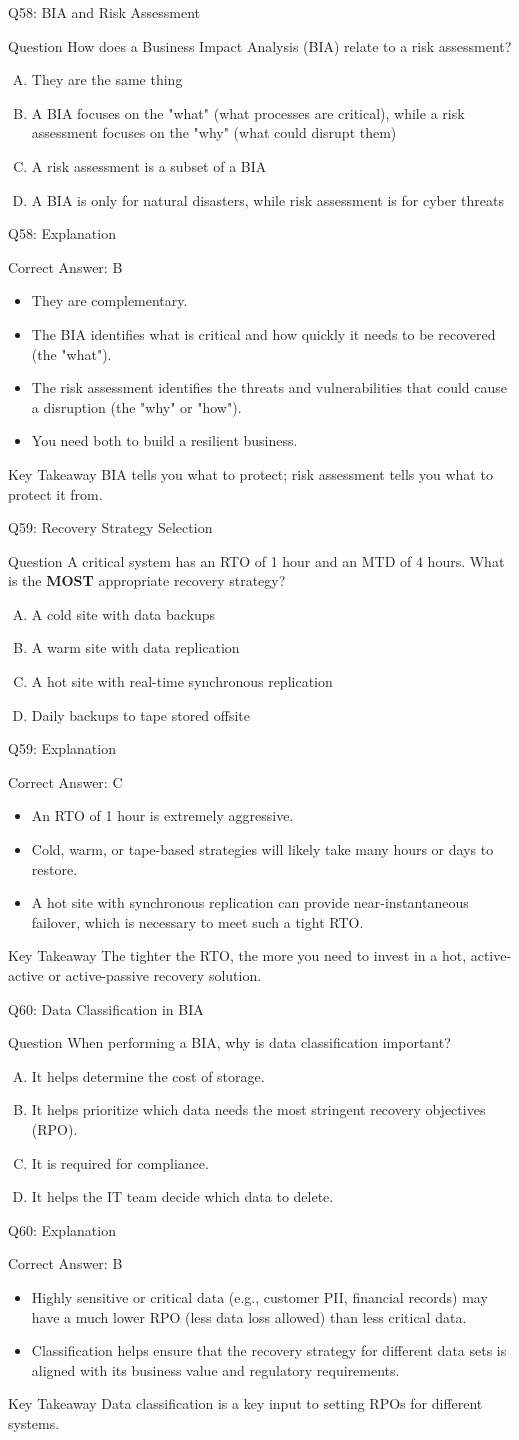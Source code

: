 \documentclass[aspectratio=169]{beamer}
\newcommand{\hq}[7]{%
	\begin{frame}{Q#1: #2}
		\begin{block}{Question}
			#3
		\end{block}
		\begin{enumerate}[(A)]
			#4
		\end{enumerate}
	\end{frame}
	\begin{frame}{Q#1: Explanation}
		\begin{block}{Correct Answer: #5}
			\begin{itemize}
				#6
			\end{itemize}
		\end{block}
		\begin{alertblock}{Key Takeaway}
			#7
		\end{alertblock}
	\end{frame}
}
\begin{document}
	\hq{58}{BIA and Risk Assessment}
	{How does a Business Impact Analysis (BIA) relate to a risk assessment?}
	{\item They are the same thing
		\item A BIA focuses on the "what" (what processes are critical), while a risk assessment focuses on the "why" (what could disrupt them)
		\item A risk assessment is a subset of a BIA
		\item A BIA is only for natural disasters, while risk assessment is for cyber threats}
	{B}
	{\item They are complementary.
		\item The BIA identifies what is critical and how quickly it needs to be recovered (the "what").
		\item The risk assessment identifies the threats and vulnerabilities that could cause a disruption (the "why" or "how").
		\item You need both to build a resilient business.}
	{BIA tells you what to protect; risk assessment tells you what to protect it from.}
	
	\hq{59}{Recovery Strategy Selection}
	{A critical system has an RTO of 1 hour and an MTD of 4 hours. What is the \textbf{MOST} appropriate recovery strategy?}
	{\item A cold site with data backups
		\item A warm site with data replication
		\item A hot site with real-time synchronous replication
		\item Daily backups to tape stored offsite}
	{C}
	{\item An RTO of 1 hour is extremely aggressive.
		\item Cold, warm, or tape-based strategies will likely take many hours or days to restore.
		\item A hot site with synchronous replication can provide near-instantaneous failover, which is necessary to meet such a tight RTO.}
	{The tighter the RTO, the more you need to invest in a hot, active-active or active-passive recovery solution.}
	
	\hq{60}{Data Classification in BIA}
	{When performing a BIA, why is data classification important?}
	{\item It helps determine the cost of storage.
		\item It helps prioritize which data needs the most stringent recovery objectives (RPO).
		\item It is required for compliance.
		\item It helps the IT team decide which data to delete.}
	{B}
	{\item Highly sensitive or critical data (e.g., customer PII, financial records) may have a much lower RPO (less data loss allowed) than less critical data.
		\item Classification helps ensure that the recovery strategy for different data sets is aligned with its business value and regulatory requirements.}
	{Data classification is a key input to setting RPOs for different systems.}
	
\end{document}
